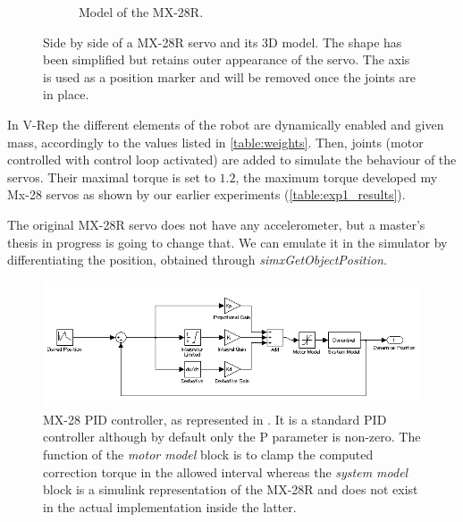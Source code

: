 \begin{figure}[htp]
\begin{subfigure}[b]{0.3\textwidth}
    \caption{Model of the MX-28R.}
    \label{fig:mx28_model}
\end{subfigure}
\caption[Side by side of a MX-28R servo and its 3D model]{Side by side of a MX-28R servo and its 3D model. The shape has been simplified but retains outer appearance of the servo. The axis is used as a position marker and will be removed once the joints are in place.}
\label{fig:servo}
\end{figure}

In V-Rep the different elements of the robot are dynamically enabled and given mass, accordingly to the values listed in \cref{table:weights}. Then, joints (motor controlled with control loop activated) are added to simulate the behaviour of the servos. Their maximal torque is set to $1.2$, the maximum torque developed my Mx-28 servos as shown by our earlier experiments (\cref{table:exp1_results}). 

The original MX-28R servo does not have any accelerometer, but a master's thesis in progress is going to change that. We can emulate it in the simulator by differentiating the position, obtained through \emph{simxGetObjectPosition}. 

\begin{figure}[htp]
\center
    \includegraphics[width = \textwidth]{figures/pidcontrol}
    \caption[MX-28 PID controller]{MX-28 PID controller, as represented in \cite{mx_28_manual}. It is a standard PID controller although by default only the P parameter is non-zero. The function of the \textit{motor model} block is to clamp the computed correction torque in the allowed interval whereas the \emph{system model} block is a simulink representation of the MX-28R and does not exist in the actual implementation inside the latter.}
    \label{fig:mx28_pid}
\end{figure}
